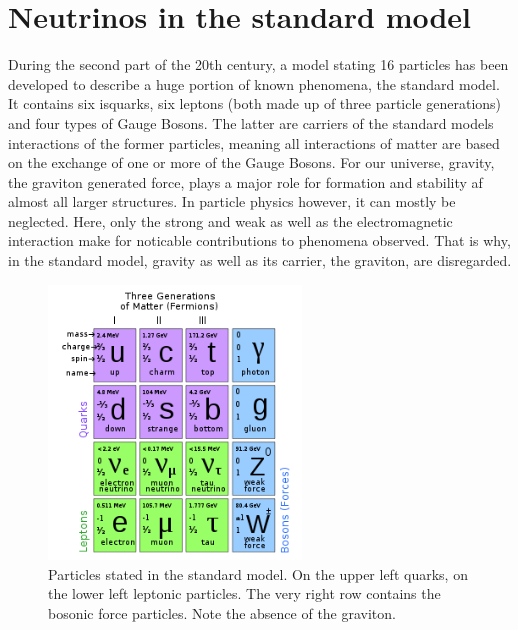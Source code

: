 	
	
    \section{Neutrinos in the standard model}
    \label{ch:Introduction:sec:Neutrinos in the standard model}
    During the second part of the 20th century, a model stating 16 particles has been developed to describe a huge portion of known phenomena, the standard model. It contains six isquarks, six leptons (both made up of three particle generations) and four types of Gauge Bosons. The latter are carriers of the standard models interactions of the former particles, meaning all interactions of matter are based on the exchange of one or more of the Gauge Bosons. 
    For our universe, gravity, the graviton generated force, plays a major role for formation and stability af almost all larger structures. In particle physics however, it can mostly be neglected. Here, only the strong and weak as well as the electromagnetic interaction make for noticable contributions to phenomena observed. That is why, in the standard model, gravity as well as its carrier, the graviton, are disregarded.
    \begin{figure}
    	\centering
    	\includegraphics[width = 0.6\textwidth]{graphics/standardModel/particles.png}
    	\caption[standard model particles]{Particles stated in the standard model. On the upper left quarks, on the lower left leptonic particles. The very right row contains the bosonic force particles. Note the absence of the graviton.\cite{particlesSM}}
    	\label{fig:standardModel:particles}
    \end{figure}
	
